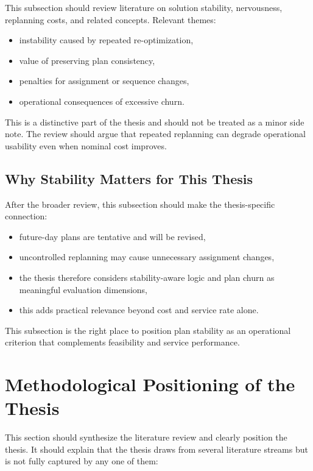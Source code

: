 This subsection should review literature on solution stability, nervousness, replanning costs, and related concepts. Relevant themes:

\begin{itemize}
    \item instability caused by repeated re-optimization,
    \item value of preserving plan consistency,
    \item penalties for assignment or sequence changes,
    \item operational consequences of excessive churn.
\end{itemize}

This is a distinctive part of the thesis and should not be treated as a minor side note. The review should argue that repeated replanning can degrade operational usability even when nominal cost improves.

\subsection{Why Stability Matters for This Thesis}

After the broader review, this subsection should make the thesis-specific connection:

\begin{itemize}
    \item future-day plans are tentative and will be revised,
    \item uncontrolled replanning may cause unnecessary assignment changes,
    \item the thesis therefore considers stability-aware logic and plan churn as meaningful evaluation dimensions,
    \item this adds practical relevance beyond cost and service rate alone.
\end{itemize}

This subsection is the right place to position plan stability as an operational criterion that complements feasibility and service performance.

\section{Methodological Positioning of the Thesis}

This section should synthesize the literature review and clearly position the thesis. It should explain that the thesis draws from several literature streams but is not fully captured by any one of them:

